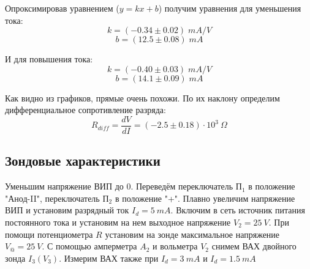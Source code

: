 \documentclass[11pt]{article}
\begin{document}
Опроксимировав уравнением (\(y = kx + b\)) получим уравнения для уменьшения тока:
\[ k = (-0.34 \pm 0.02)\; mA/V \]
\[ b = (12.5 \pm 0.08)\; mA \]

И для повышения тока:
\[ k = (-0.40 \pm 0.03)\; mA/V \]
\[ b = (14.1 \pm 0.09)\; mA \]

Как видно из графиков, прямые очень похожи. По их наклону определим дифференциальное сопротивление разряда:
\[ R_{diff} = \frac{dV}{dI} = (-2.5 \pm 0.18)\cdot 10^{3}\: \Omega \]

\subsection{Зондовые характеристики}
Уменьшим напряжение ВИП до 0. Переведём переключатель \(\text{П}_1\) в положение "Анод-II",
переключатель \(\text{П}_2\) в положение "+".
Плавно увеличим напряжение ВИП и установим разрядный ток \(I_d = 5\:mA\). Включим в сеть источник
питания постоянного тока и установим на нем выходное напряжение \(V_2 = 25\:V\). При помощи
потенциометра \(R\) установим на зонде максимальное напряжение \(V_@ = 25\:V\).
С помощью амперметра \(A_2\) и вольметра \(V_2\) снимем ВАХ двойного зонда \(I_3\left(V_3\right)\).
Измерим ВАХ также при \(I_d = 3\: mA\) и \(I_d = 1.5\: mA\)
\end{document}
